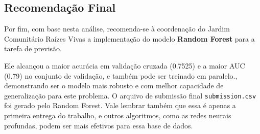 \subsection*{Recomendação Final}
Por fim, com base nesta análise, recomenda-se à coordenação do Jardim Comunitário Raízes Vivas a implementação do modelo \textbf{Random Forest} para a tarefa de previsão.

Ele alcançou a maior acurácia em validação cruzada (0.7525)  e a maior AUC (0.79)  no conjunto de validação, e também pode ser treinado em paralelo., demonstrando ser o modelo mais robusto e com melhor capacidade de generalização para este problema. O arquivo de submissão final \texttt{submission.csv} foi gerado pelo Random Forest. Vale lembrar também que essa é apenas a primeira entrega do trabalho, e outros algoritmos, como as redes neurais profundas, podem ser mais efetivos para essa base de dados.